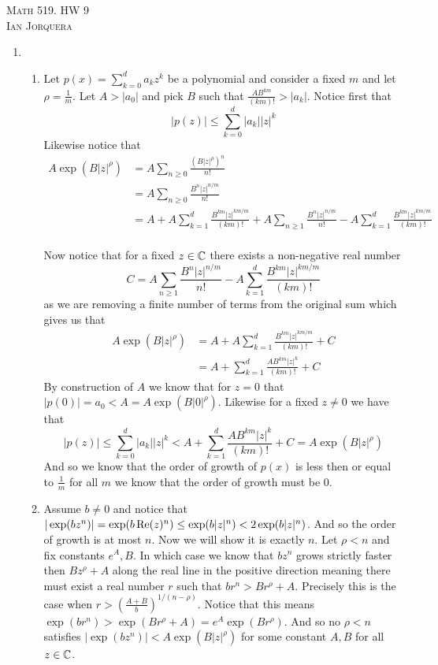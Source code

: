 \documentclass[12pt]{amsart}
\begin{document}
\begin{center}
    \textsc{Math 519. HW 9\\ Ian Jorquera}
\end{center}
\vspace{1em}

\begin{enumerate}
\item %
\begin{enumerate}
    \item Let $p(x)=\sum_{k=0}^da_kz^k$ be a polynomial and consider a fixed $m$ and let $\rho=\frac{1}{m}$. Let $A>|a_0|$ and pick $B$ such that $\frac{AB^{km}}{(km)!}>|a_k|$. Notice first that
$$|p(z)|\leq \sum_{k=0}^d|a_k||z|^k$$
Likewise notice that 
\begin{align*}
    A\exp(B|z|^\rho)&=A\sum_{n\geq 0} \frac{(B|z|^{\rho})^n}{n!}\\
    &=A\sum_{n\geq 0} \frac{B^n|z|^{n/m}}{n!}\\
    &=A+A\sum_{k=1}^{d} \frac{B^{km}|z|^{km/m}}{(km)!}+A\sum_{n\geq 1} \frac{B^n|z|^{n/m}}{n!}-A\sum_{k=1}^{d} \frac{B^{km}|z|^{km/m}}{(km)!}\\
\end{align*}

Now notice that for a fixed $z\in \mathbb{C}$ there exists a non-negative real number 
$$C=A\sum_{n\geq 1} \frac{B^n|z|^{n/m}}{n!}-A\sum_{k=1}^{d} \frac{B^{km}|z|^{km/m}}{(km)!}$$
as we are removing a finite number of terms from the original sum which gives us that
\begin{align*}
    A\exp(B|z|^\rho)&=A+A\sum_{k=1}^{d} \frac{B^{km}|z|^{km/m}}{(km)!}+C\\
    &=A+\sum_{k=1}^{d} \frac{AB^{km}|z|^{k}}{(km)!}+C
\end{align*}
By construction of $A$ we know that for $z=0$ that $|p(0)|=a_0<A=A\exp(B|0|^\rho)$. Likewise for a fixed $z\neq 0$ we have that 
$$|p(z)|\leq \sum_{k=0}^d|a_k||z|^k<A+\sum_{k=1}^{d} \frac{AB^{km}|z|^{k}}{(km)!}+C=A\exp(B|z|^\rho)$$
And so we know that the order of growth of $p(x)$ is less then or equal to $\frac{1}{m}$ for all $m$ we know that the order of growth must be $0$.\\

\item Assume $b\neq 0$ and notice that $|\exp({bz^n})|=\exp(b\operatorname{\mathrm{Re}}(z)^n)\leq\exp(b|z|^n)<2\exp(b|z|^n)$. And so the order of growth is at most $n$. Now we will show it is exactly $n$. Let $\rho< n$ and fix constants $e^A,B$. In which case we know that $bz^n$ grows strictly faster then $Bz^\rho+A$ along the real line in the positive direction meaning there must exist a real number $r$ such that $br^n>Br^\rho+A$. Precisely this is the case when $r>\left(\frac{A+B}{b}\right)^{1/(n-\rho)}$. Notice that this means
$\exp({br^n})>\exp(Br^\rho+A)=e^A\exp(Br^\rho)$. And so 
no $\rho<n$ satisfies $|\exp({bz^n})|<A\exp(B|z|^\rho)$ for some constant $A,B$ for all $z\in \mathbb{C}$. \\


\end{enumerate}
\end{enumerate}
\end{document}
